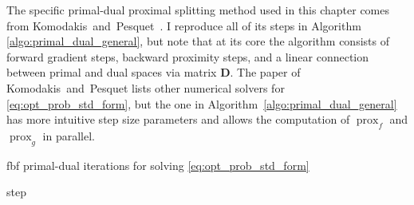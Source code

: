 The specific primal-dual proximal splitting method used in this chapter comes from Komodakis~and~Pesquet~\cite[Algorithm~6]{komodakis2015}. I reproduce all of its steps in Algorithm \ref{algo:primal_dual_general}, but note that at its core the algorithm consists of forward gradient steps, backward proximity steps, and a linear connection between primal and dual spaces via matrix $\mathbf{D}$. The paper of Komodakis~and~Pesquet lists other numerical solvers for \eqref{eq:opt_prob_std_form}, but the one in Algorithm~\ref{algo:primal_dual_general} has more intuitive step size parameters and allows the computation of $\operatorname{prox}_{f}$ and $\operatorname{prox}_{g}$ in parallel.

\begin{algorithm}
    \caption{\acrshort{fbf} primal-dual iterations for solving \eqref{eq:opt_prob_std_form}}
    \label{algo:primal_dual_general}
    \begin{algorithmic}[1]
        \Repeat



             step


	\end{algorithmic}
\end{algorithm}

